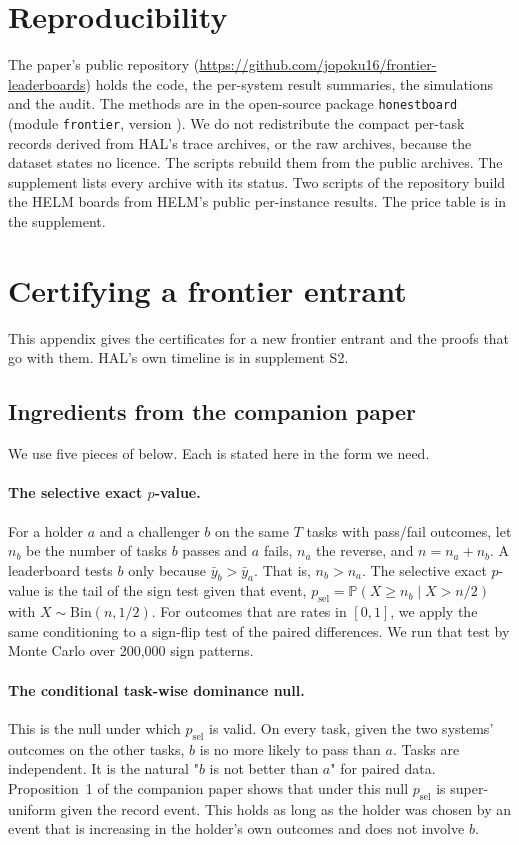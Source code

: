 \documentclass[11pt]{article}
\renewcommand{\Pr}{\mathbb{P}}
\begin{document}
\section*{Reproducibility}
The paper's public repository (\url{https://github.com/jopoku16/frontier-leaderboards}) holds the code, the per-system result summaries, the simulations and the audit. The methods are in the open-source package \texttt{honestboard} (module \texttt{frontier}, version \NumHonestboardVersion{}). We do not redistribute the compact per-task records derived from HAL's trace archives, or the raw archives, because the dataset states no licence. The scripts rebuild them from the public archives. The supplement lists every archive with its status. Two scripts of the repository build the HELM boards from HELM's public per-instance results. The price table is in the supplement.

\appendix
\small

\section{Certifying a frontier entrant}
\label{app:certify}
This appendix gives the certificates for a new frontier entrant and the proofs that go with them. HAL's own timeline is in supplement S2.

\subsection{Ingredients from the companion paper}
\label{sec:ingredients}
We use five pieces of \citet{opoku2026records} below. Each is stated here in the form we need.

\paragraph{The selective exact $p$-value.} For a holder $a$ and a challenger $b$ on the same $T$ tasks with pass/fail outcomes, let $n_b$ be the number of tasks $b$ passes and $a$ fails, $n_a$ the reverse, and $n=n_a+n_b$. A leaderboard tests $b$ only because $\bar y_b>\bar y_a$. That is, $n_b>n_a$. The selective exact $p$-value is the tail of the sign test given that event, $p_{\mathrm{sel}}=\Pr(X\ge n_b\mid X>n/2)$ with $X\sim\mathrm{Bin}(n,1/2)$. For outcomes that are rates in $[0,1]$, we apply the same conditioning to a sign-flip test of the paired differences. We run that test by Monte Carlo over 200{,}000 sign patterns.

\paragraph{The conditional task-wise dominance null.} This is the null under which $p_{\mathrm{sel}}$ is valid. On every task, given the two systems' outcomes on the other tasks, $b$ is no more likely to pass than $a$. Tasks are independent. It is the natural "$b$ is not better than $a$" for paired data. Proposition~1 of the companion paper shows that under this null $p_{\mathrm{sel}}$ is super-uniform given the record event. This holds as long as the holder was chosen by an event that is increasing in the holder's own outcomes and does not involve $b$.
\end{document}
